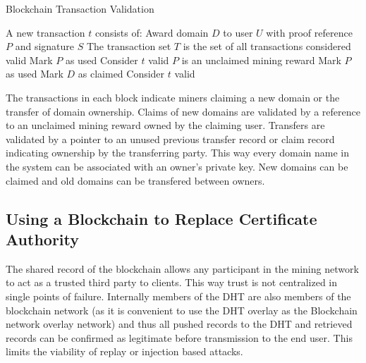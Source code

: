 \documentclass[11pt]{IEEEtran} %
\begin{document}
\begin{algorithm}
\caption{Blockchain Transaction Validation}
\label{validation}
\begin{algorithmic}[1]  %
\STATE A new transaction $t$ consists of: Award domain $D$ to user $U$ with proof reference $P$ and signature $S$
\STATE The transaction set $T$ is the set of all transactions considered valid
    		\STATE Mark $P$ as used
            \STATE Consider $t$ valid
        \ELSE
            	\STATE $P$ is an unclaimed mining reward
                	\STATE Mark $P$ as used
                    \STATE Mark $D$ as claimed
                    \STATE Consider $t$ valid
                \ENDIF
			\ENDIF
         \ENDIF
    \ENDIF
\ENDIF
\end{algorithmic}
\end{algorithm}

The transactions in each block indicate miners claiming a new domain or the transfer of domain ownership. Claims of new domains are validated by a reference to an unclaimed mining reward owned by the claiming user. Transfers are validated by a pointer to an unused previous transfer record or claim record indicating ownership by the transferring party. This way every domain name in the system can be associated with an owner's private key. New domains can be claimed and old domains can be transfered between owners.






\subsection{Using a Blockchain to Replace Certificate Authority}
The shared record of the blockchain allows any participant in the mining network to act as a trusted third party to clients. This way trust is not centralized in single points of failure. Internally members of the DHT are also members of the blockchain network (as it is convenient to use the DHT overlay as the Blockchain network overlay network) and thus all pushed records to the DHT and retrieved records can be confirmed as legitimate before transmission to the end user. This limits the viability of replay or injection based attacks.
\end{document}
